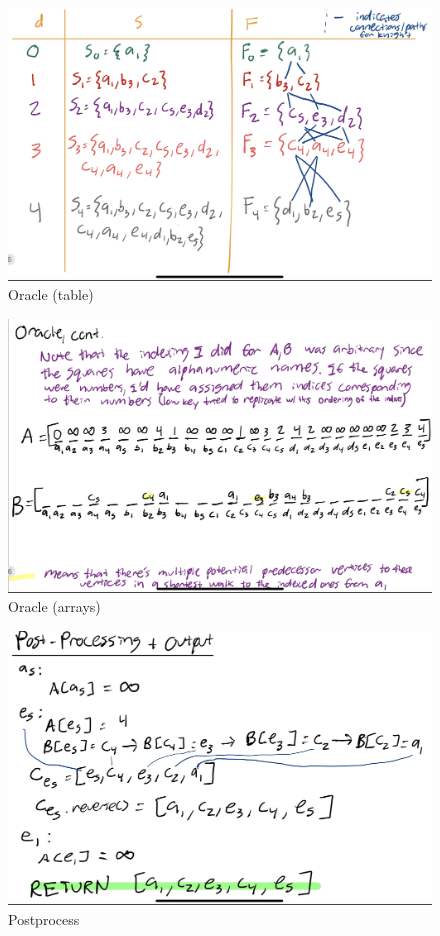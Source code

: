 \documentclass[11pt]{article}
\begin{document}
\begin{enumerate}
\begin{figure}[H]
    \centering
    \includegraphics[width=.75\linewidth]{IMG_0133.jpg}
    \caption{Oracle (table)}
    \label{fig:oracle-table}
\end{figure}

\begin{figure}[H]
    \centering
    \includegraphics[width=.75\linewidth]{IMG_0134.jpg}
    \caption{Oracle (arrays)}
    \label{fig:oracle-arrays}
\end{figure}

\begin{figure}[H]
    \centering
    \includegraphics[width=.75\linewidth]{IMG_0135.jpg}
    \caption{Postprocess}
    \label{fig:postprocess}
\end{figure}



\end{enumerate}
\end{document}
